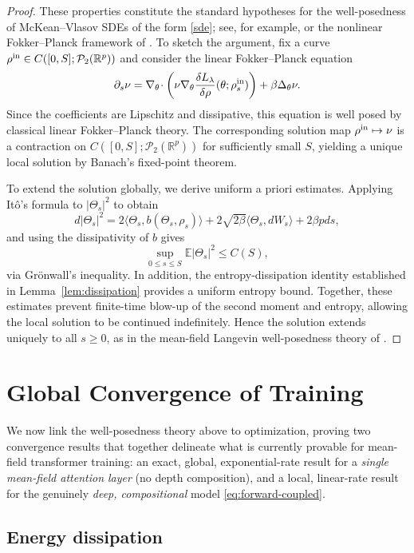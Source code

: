 \documentclass[11pt,a4wide]{article}
\theoremstyle{definition}
\newcommand{\R}{\mathbb{R}}
\newcommand{\Prob}{\mathcal{P}}
\begin{document}
\begin{proof}
These properties constitute the standard hypotheses for the well-posedness of McKean--Vlasov SDEs of the form \eqref{sde}; see, for example,
\cite[Theorem~1.1]{carmona2018probabilistic} or the nonlinear Fokker--Planck framework of \cite{carrillo2003kinetic}. To sketch the argument, fix a  curve
$\rho^{\rm in}\in C([0,S];\Prob_2(\R^p))$
and consider the linear Fokker--Planck equation
\[
\partial_s\nu
=
\nabla_\theta\!\cdot
\left(
\nu
\nabla_\theta
\frac{\delta L_\lambda}{\delta \rho}
(\theta; \rho_s^{\rm in})
\right)
+
\beta\Delta_\theta\nu.
\]
Since the coefficients are Lipschitz and dissipative, this equation is well posed by classical linear Fokker--Planck theory. The corresponding solution map
$\rho^{\rm in}\mapsto\nu$
is a contraction on
$C([0,S];\Prob_2(\R^p))$
for sufficiently small $S$, yielding a unique local solution by Banach's fixed-point theorem.

To extend the solution globally, we derive uniform a priori estimates. Applying It\^o's formula to $|\Theta_s|^2$ to obtain 
$$
d |\Theta_s|^2=2\langle \Theta_s, b(\Theta_s, \rho_s)\rangle +2\sqrt{2\beta} \langle \Theta_s, dW_s \rangle +2\beta pds, 
$$
and using the dissipativity of $b$ gives
\[
\sup_{0\le s\le S}
\mathbb E|\Theta_s|^2
\le C(S),
\]
via Gr\"onwall's inequality. In addition, the entropy-dissipation identity established in Lemma~\ref{lem:dissipation} provides a uniform entropy bound. Together, these estimates prevent finite-time blow-up of the second moment and entropy, allowing the local solution to be continued indefinitely. Hence the solution extends uniquely to all
$s\ge0$,  as in the mean-field Langevin well-posedness theory of
\cite[Theorem~2.4]{hu2021meanfield}.
\end{proof}

\section{Global Convergence of Training}
\label{sec:convergence}

We now link the well-posedness theory above to optimization, proving two convergence results that together delineate what is currently provable for mean-field transformer training: an exact, global, exponential-rate result for a \emph{single mean-field attention layer} (no depth composition), and a local, linear-rate result for the genuinely \emph{deep, compositional} model \eqref{eq:forward-coupled}.

\subsection{Energy dissipation}
\end{document}
